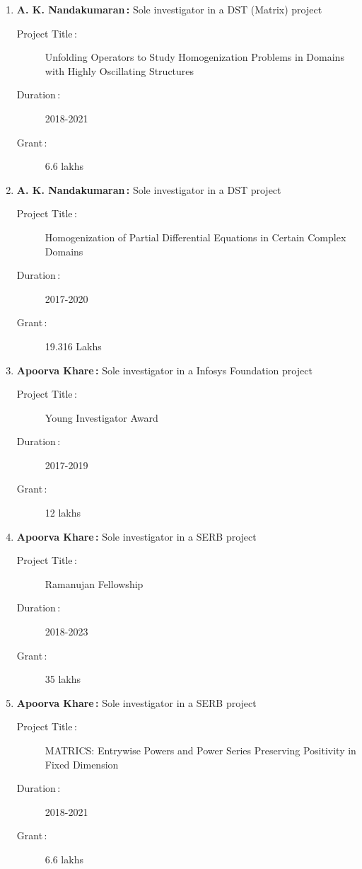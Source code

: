 \begin{enumerate}

\item {\bf A. K. Nandakumaran\,:} Sole investigator in a DST (Matrix) project
\begin{description}
  \item[Project Title\,:] Unfolding Operators to Study Homogenization Problems in Domains with Highly Oscillating Structures
  \item[Duration\,:] 2018-2021
  \item[Grant\,:] 6.6 lakhs
\end{description}


\item {\bf A. K. Nandakumaran\,:} Sole investigator in a DST project
\begin{description}
  \item[Project Title\,:] Homogenization of Partial Differential Equations in Certain Complex Domains
  \item[Duration\,:] 2017-2020
  \item[Grant\,:] 19.316 Lakhs
\end{description}


\item {\bf Apoorva Khare\,:} Sole investigator in a Infosys Foundation project
\begin{description}
  \item[Project Title\,:] Young Investigator Award
  \item[Duration\,:] 2017-2019
  \item[Grant\,:] 12 lakhs
\end{description}


\item {\bf Apoorva Khare\,:} Sole investigator in a SERB project
\begin{description}
  \item[Project Title\,:] Ramanujan Fellowship
  \item[Duration\,:] 2018-2023
  \item[Grant\,:] 35 lakhs
\end{description}


\item {\bf Apoorva Khare\,:} Sole investigator in a SERB project
\begin{description}
  \item[Project Title\,:] MATRICS: Entrywise Powers and Power Series Preserving Positivity in Fixed Dimension
  \item[Duration\,:] 2018-2021
  \item[Grant\,:] 6.6 lakhs
\end{description}



\end{enumerate}
